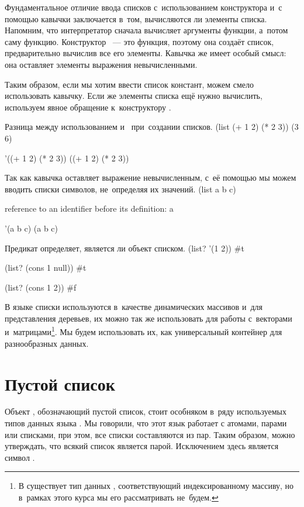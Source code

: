 Фундаментальное отличие ввода списков с~использованием конструктора и~с помощью кавычки заключается в~том, вычисляются ли элементы списка. Напомним, что интерпретатор \Scheme сначала вычисляет аргументы функции, а~потом саму функцию. Конструктор ~--- это функция, поэтому она создаёт список, предварительно вычислив все его элементы. Кавычка же имеет особый смысл: она оставляет элементы выражения невычисленными. 

Таким образом, если мы хотим ввести список констант, можем смело использовать кавычку. Если же элементы списка ещё нужно вычислить, используем явное обращение к~конструктору .

\begin{example}{Разница между использованием  и~ при~создании списков.}
\REPL
  {(list (+ 1 2) (* 2 3))}
  {(3 6)}

\REPL
  {'((+ 1 2) (* 2 3))}
  {((+ 1 2) (* 2 3))}
\end{example}

\begin{example}{Так как кавычка оставляет выражение невычисленным, с~её помощью мы можем вводить списки символов, не~определяя их значений.}
\REPLin
  {(list a b c)}

{\errorstyle reference to an identifier before its definition: a}

\REPL
  {'(a b c)}
  {(a b c)}
\end{example}

\begin{example}{Предикат  определяет, является ли объект списком.}
\REPL
  {(list? '(1 2))}
  {#t}

\REPL
  {(list? (cons 1 null))}
  {#t}

\REPL
  {(list? (cons 1 2))}
  {#f}
\end{example}

В языке \Scheme списки используются в~качестве динамических массивов и~для представления деревьев, их можно так же использовать для работы с~векторами и~матрицами\footnote{В \Scheme существует тип данных , соответствующий индексированному массиву, но в~рамках этого курса мы его рассматривать не~будем.}. Мы будем использовать их, как универсальный контейнер для разнообразных данных.

\section[2]{Пустой список}%
Объект , обозначающий пустой список, стоит особняком в~ряду используемых типов данных языка \Scheme. Мы говорили, что этот язык работает с атомами, парами или списками, при этом, все списки составляются из пар. Таким образом, можно утверждать, что всякий список является парой. Исключением здесь является символ .

